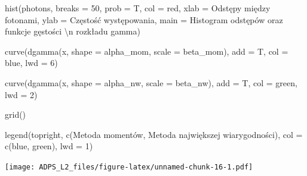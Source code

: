 \documentclass[
]{article}
\newenvironment{Shaded}{\begin{snugshade}}{\end{snugshade}}
\newcommand{\AttributeTok}[1]{\textcolor[rgb]{0.77,0.63,0.00}{#1}}
\newcommand{\DecValTok}[1]{\textcolor[rgb]{0.00,0.00,0.81}{#1}}
\newcommand{\FunctionTok}[1]{\textcolor[rgb]{0.00,0.00,0.00}{#1}}
\newcommand{\NormalTok}[1]{#1}
\newcommand{\SpecialCharTok}[1]{\textcolor[rgb]{0.00,0.00,0.00}{#1}}
\newcommand{\StringTok}[1]{\textcolor[rgb]{0.31,0.60,0.02}{#1}}
\begin{document}
\begin{Shaded}
\begin{Highlighting}[]
\FunctionTok{hist}\NormalTok{(photons, }\AttributeTok{breaks =} \DecValTok{50}\NormalTok{, }\AttributeTok{prob =}\NormalTok{ T, }\AttributeTok{col =} \StringTok{\textquotesingle{}red\textquotesingle{}}\NormalTok{, }
     \AttributeTok{xlab =} \StringTok{\textquotesingle{}Odstępy między fotonami\textquotesingle{}}\NormalTok{, }\AttributeTok{ylab =} \StringTok{\textquotesingle{}Częstość występowania\textquotesingle{}}\NormalTok{,}
  \AttributeTok{main =} \StringTok{\textquotesingle{}Histogram odstępów oraz funkcje gęstości }\SpecialCharTok{\textbackslash{}n}\StringTok{ rozkładu gamma\textquotesingle{}}\NormalTok{)}

\FunctionTok{curve}\NormalTok{(}\FunctionTok{dgamma}\NormalTok{(x, }\AttributeTok{shape =}\NormalTok{ alpha\_mom, }\AttributeTok{scale =}\NormalTok{ beta\_mom), }\AttributeTok{add =}\NormalTok{ T, }
      \AttributeTok{col =} \StringTok{\textquotesingle{}blue\textquotesingle{}}\NormalTok{, }\AttributeTok{lwd =} \DecValTok{6}\NormalTok{)}

\FunctionTok{curve}\NormalTok{(}\FunctionTok{dgamma}\NormalTok{(x, }\AttributeTok{shape =}\NormalTok{ alpha\_nw, }\AttributeTok{scale =}\NormalTok{ beta\_nw), }\AttributeTok{add =}\NormalTok{ T,}
      \AttributeTok{col =} \StringTok{\textquotesingle{}green\textquotesingle{}}\NormalTok{, }\AttributeTok{lwd =} \DecValTok{2}\NormalTok{)}

\FunctionTok{grid}\NormalTok{()}

\FunctionTok{legend}\NormalTok{(}\StringTok{\textquotesingle{}topright\textquotesingle{}}\NormalTok{, }\FunctionTok{c}\NormalTok{(}\StringTok{\textquotesingle{}Metoda momentów\textquotesingle{}}\NormalTok{, }\StringTok{\textquotesingle{}Metoda największej wiarygodności\textquotesingle{}}\NormalTok{), }\AttributeTok{col =} \FunctionTok{c}\NormalTok{(}\StringTok{\textquotesingle{}blue\textquotesingle{}}\NormalTok{, }\StringTok{\textquotesingle{}green\textquotesingle{}}\NormalTok{), }\AttributeTok{lwd =} \DecValTok{1}\NormalTok{)}
\end{Highlighting}
\end{Shaded}

\texttt{[image: ADPS\_L2\_files/figure-latex/unnamed-chunk-16-1.pdf]}
\end{document}
